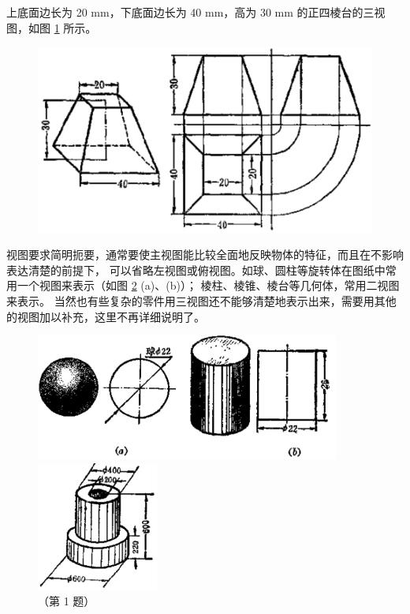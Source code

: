 上底面边长为 20 mm，下底面边长为 40 mm，高为 30 mm 的正四棱台的三视图，如图 \ref{fig:czjh2-8-20} 所示。

\begin{figure}[htbp]
    \centering
    \includegraphics[width=12cm]{../pic/czjh2-ch8-20.png}
    \caption{}\label{fig:czjh2-8-20}
\end{figure}

视图要求简明扼要，通常要使主视图能比较全面地反映物体的特征，而且在不影响表达清楚的前提下，
可以省略左视图或俯视图。如球、圆柱等旋转体在图纸中常用一个视图来表示（如图 \ref{fig:czjh2-8-21} (a)、(b)）；
棱柱、棱锥、棱台等几何体，常用二视图来表示。
当然也有些复杂的零件用三视图还不能够清楚地表示出来，需要用其他的视图加以补充，这里不再详细说明了。

\begin{figure}[htbp]
    \centering
    \begin{minipage}[b]{10cm}
        \centering
        \includegraphics[width=10cm]{../pic/czjh2-ch8-21.png}
        \caption{}\label{fig:czjh2-8-21}
    \end{minipage}
    \qquad
    \begin{minipage}[b]{4cm}
        \centering
        \includegraphics[width=4cm]{../pic/czjh2-ch8-subsec4-lx-01.png}
        \caption*{（第 1 题）}
    \end{minipage}
\end{figure}

